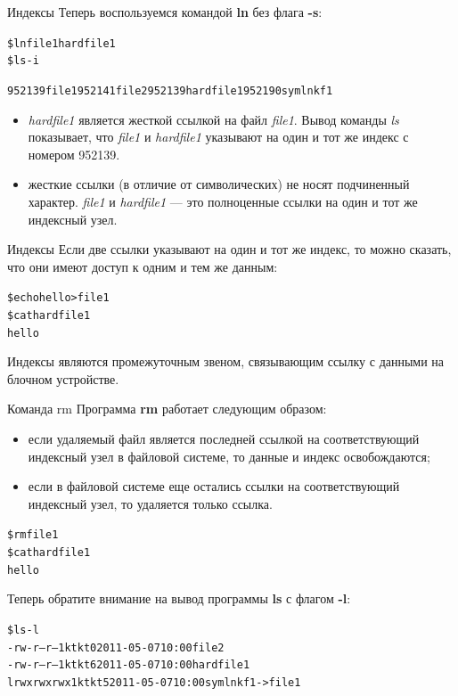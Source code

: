 \documentclass[xcolor=table]{beamer}
\begin{document}
\begin{frame}[fragile]{Индексы}
	Теперь воспользуемся командой \textbf{ln} без флага \textbf{-s}:
	\begin{alltt}
		\$ ln file1 hardfile1
		\$ ls -i

		952139 file1 952141 file2 952139 hardfile1 952190 symlnkf1
	\end{alltt}
	\begin{itemize}
		\item \textit{hardfile1} является жесткой ссылкой на файл \textit{file1}. Вывод команды \textit{ls} показывает, что \textit{file1} и \textit{hardfile1} указывают на один и тот же индекс с номером 952139. 
		\item жесткие ссылки (в отличие от символических) не носят подчиненный характер. \textit{file1} и \textit{hardfile1} — это полноценные ссылки на один и тот же индексный узел.
	\end{itemize}
\end{frame}

\begin{frame}[fragile]{Индексы}
	Если две ссылки указывают на один и тот же индекс, то можно сказать, что они имеют доступ к одним и тем же данным:
	\begin{alltt}
		\$ echo hello > file1
		\$ cat hardfile1
		hello
	\end{alltt}
	Индексы являются промежуточным звеном, связывающим ссылку с данными на блочном устройстве. 
\end{frame}

\begin{frame}[fragile]{Команда rm}
	Программа \textbf{rm} работает следующим образом:
	\begin{itemize}
		\item если удаляемый файл является последней ссылкой на соответствующий индексный узел в файловой системе, то данные и индекс 		освобождаются;
		\item если в файловой системе еще остались ссылки на соответствующий индексный узел, то удаляется только ссылка.
	\end{itemize}
	\begin{alltt}
		\$ rm file1
		\$ cat hardfile1
		hello
	\end{alltt}
	
	Теперь обратите внимание на вывод программы \textbf{ls} с флагом \textbf{-l}:
	\begin{alltt}
		\$ ls -l
		-rw-r--r-- 1 kt kt 0 2011-05-07 10:00 file2
		-rw-r--r-- 1 kt kt 6 2011-05-07 10:00 hardfile1
		lrwxrwxrwx 1 kt kt 5 2011-05-07 10:00 symlnkf1 -> file1
	\end{alltt}
\end{frame}
\end{document}
